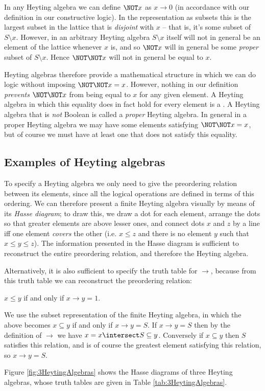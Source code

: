 In any Heyting algebra we can define $\NOT x$ as $x \to 0$ (in accordance with our definition in our constructive logic).  In the representation as subsets this is the largest subset in the lattice that is \emph{disjoint} with $x$ -- that is, it's some subset of $S \setminus x$.  However, in an arbitrary Heyting algebra $S \setminus x$ itself will not in general be an element of the lattice whenever $x$ is, and so $\NOT x$ will in general be some \emph{proper} subset of $S \setminus x$.  Hence $\NOT \NOT x$ will not in general be equal to $x$.

Heyting algebras therefore provide a mathematical structure in which we can do logic without imposing $\NOT \NOT x = x$.  However, nothing in our definition \emph{prevents} $\NOT \NOT x$ from being equal to $x$ for any given element.  A Heyting algebra in which this equality does in fact hold for every element is a .  A Heyting algebra that is \emph{not} Boolean is called a \emph{proper} Heyting algebra.  In general in a proper Heyting algebra we may have some elements satisfying $\NOT \NOT x = x$, but of course we must have at least one that does not satisfy this equality.




\subsection{Examples of Heyting algebras}

To specify a Heyting algebra we only need to give the preordering relation between its elements, since all the logical operations are defined in terms of this ordering.  We can therefore present a finite Heyting algebra visually by means of its \emph{Hasse diagram}; to draw this, we draw a dot for each element, arrange the dots so that greater elements are above lesser ones, and connect dots $x$ and $z$ by a line iff one element \emph{covers} the other (i.e. $x \leq z$ and there is no element $y$ such that $x \leq y \leq z$).  The information presented in the Hasse diagram is sufficient to reconstruct the entire preordering relation, and therefore the Heyting algebra.

Alternatively, it is also sufficient to specify the truth table for $\to$, because from this truth table we can reconstruct the preordering relation:
\begin{Lemma}
$x \leq y$ if and only if $x \to y = 1$.
\end{Lemma}
\begin{Proof}
We use the subset representation of the finite Heyting algebra, in which the above becomes
$x \subseteq y$ if and only if $x \to y = S$.
If $x \to y = S$ then by the definition of $\to$ we have $x = x \intersect S  \subseteq y$.  Conversely if $x \subseteq y$ then $S$ satisfies this relation, and is of course the greatest element satisfying this relation, so $x \to y = S$.
\end{Proof}
Figure \ref{fig:3HeytingAlgebras} shows the Hasse diagrams of three Heyting algebras, whose truth tables are given in Table \ref{tab:3HeytingAlgebras}.


